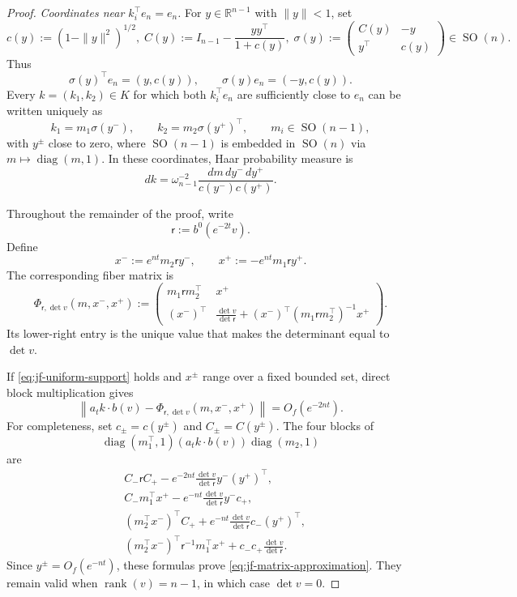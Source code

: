 \documentclass[reqno,11pt]{amsart}
\numberwithin{equation}{section}
\theoremstyle{definition}
\theoremstyle{remark}
\newcommand{\op}{\operatorname}
\newcommand{\rank}{\op{rank}}
\newcommand{\SO}{\op{SO}}
\newcommand{\diag}{\op{diag}}
\begin{document}
\begin{proof}
\smallskip
\noindent\emph{Coordinates near $k_i^{\intercal}e_n=e_n$.}
For $y\in\mathbb R^{n-1}$ with $\|y\|<1$, set
$$
c(y):=(1-\|y\|^2)^{1/2},
\;
C(y):=I_{n-1}-\frac{yy^{\intercal}}{1+c(y)},\;
\sigma(y):=
\begin{pmatrix}
C(y)&-y\\
y^{\intercal}&c(y)
\end{pmatrix}
\in\SO(n).
$$
Thus
$$
\sigma(y)^{\intercal}e_n=(y,c(y)),
\qquad
\sigma(y)e_n=(-y,c(y)).
$$
Every $k=(k_1,k_2)\in K$ for which both
$k_i^{\intercal}e_n$ are sufficiently close to $e_n$ can be written uniquely as
\begin{equation}\label{eq:jf-hemisphere-coordinates}
k_1=m_1\sigma(y^-),
\qquad
k_2=m_2\sigma(y^+)^{\intercal},
\qquad
m_i\in\SO(n-1),
\end{equation}
with $y^\pm$ close to zero, where $\SO(n-1)$ is embedded in $\SO(n)$
via $m\mapsto\diag(m,1)$. In these coordinates, Haar probability
measure is
\begin{equation}\label{eq:jf-haar-hemisphere}
dk=\omega_{n-1}^{-2}
\frac{dm\,dy^-\,dy^+}{c(y^-)c(y^+)}.
\end{equation}

Throughout the remainder of the proof, write
$$
\mathsf r:=b^0(e^{-2t}v).
$$
Define
$$
x^-:=e^{nt}m_2\mathsf r y^-,
\qquad
x^+:=-e^{nt}m_1\mathsf r y^+.
$$
The corresponding fiber matrix is
\begin{equation}\label{eq:jf-fiber-matrix}
\Phi_{\mathsf r,\det v}(m,x^-,x^+)
:=
\begin{pmatrix}
m_1\mathsf r m_2^{\intercal}&x^+\\
(x^-)^{\intercal}&
\displaystyle
\frac{\det v}{\det\mathsf r}
+(x^-)^{\intercal}
(m_1\mathsf r m_2^{\intercal})^{-1}x^+
\end{pmatrix}.
\end{equation}
Its lower-right entry is the unique value that makes
 the determinant equal to
$\det v$.

If \eqref{eq:jf-uniform-support} holds and $x^\pm$ range over a fixed
bounded set, direct block multiplication gives
\begin{equation}\label{eq:jf-matrix-approximation}
\left\|a_tk\cdot b(v)-
\Phi_{\mathsf r,\det v}(m,x^-,x^+)\right\|
=O_f(e^{-2nt}).
\end{equation}
For completeness, set $c_\pm=c(y^\pm)$ and
$C_\pm=C(y^\pm)$. The four blocks of
$$
\diag(m_1^{\intercal},1)(a_tk\cdot b(v))\diag(m_2,1)
$$
are
$$
\begin{aligned}
&C_-\mathsf r C_+
-e^{-2nt}\frac{\det v}{\det\mathsf r}
y^-(y^+)^{\intercal},\\
&C_-m_1^{\intercal}x^+
-e^{-nt}\frac{\det v}{\det\mathsf r}y^-c_+,\\
&(m_2^{\intercal}x^-)^{\intercal}C_+
+e^{-nt}\frac{\det v}{\det\mathsf r}c_-(y^+)^{\intercal},\\
&(m_2^{\intercal}x^-)^{\intercal}\mathsf r^{-1}
m_1^{\intercal}x^+
+c_-c_+\frac{\det v}{\det\mathsf r}.
\end{aligned}
$$
Since $y^\pm=O_f(e^{-nt})$, these formulas prove
\eqref{eq:jf-matrix-approximation}. They remain valid when
$\rank(v)=n-1$, in which case $\det v=0$.


\end{proof}
\end{document}
